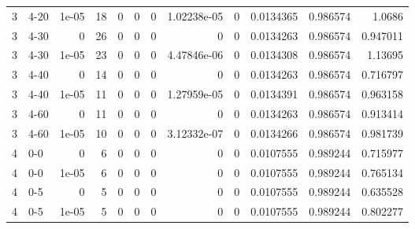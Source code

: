 \begin{tabular}{rlrrrrrrrrrr}
     3 & 4-20   &      1e-05 &          18 &                 0 &                 0 &     0           &     1.02238e-05 &      0           &        0.0134365 &               0.986574 &           1.0686   \\
     3 & 4-30   &      0     &          26 &                 0 &                 0 &     0           &     0           &      0           &        0.0134263 &               0.986574 &           0.947011 \\
     3 & 4-30   &      1e-05 &          23 &                 0 &                 0 &     0           &     4.47846e-06 &      0           &        0.0134308 &               0.986574 &           1.13695  \\
     3 & 4-40   &      0     &          14 &                 0 &                 0 &     0           &     0           &      0           &        0.0134263 &               0.986574 &           0.716797 \\
     3 & 4-40   &      1e-05 &          11 &                 0 &                 0 &     0           &     1.27959e-05 &      0           &        0.0134391 &               0.986574 &           0.963158 \\
     3 & 4-60   &      0     &          11 &                 0 &                 0 &     0           &     0           &      0           &        0.0134263 &               0.986574 &           0.913414 \\
     3 & 4-60   &      1e-05 &          10 &                 0 &                 0 &     0           &     3.12332e-07 &      0           &        0.0134266 &               0.986574 &           0.981739 \\
     4 & 0-0    &      0     &           6 &                 0 &                 0 &     0           &     0           &      0           &        0.0107555 &               0.989244 &           0.715977 \\
     4 & 0-0    &      1e-05 &           6 &                 0 &                 0 &     0           &     0           &      0           &        0.0107555 &               0.989244 &           0.765134 \\
     4 & 0-5    &      0     &           5 &                 0 &                 0 &     0           &     0           &      0           &        0.0107555 &               0.989244 &           0.635528 \\
     4 & 0-5    &      1e-05 &           5 &                 0 &                 0 &     0           &     0           &      0           &        0.0107555 &               0.989244 &           0.802277 \\

\end{tabular}
